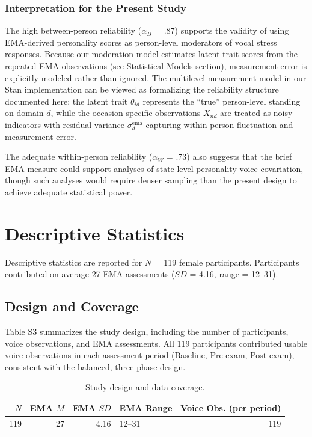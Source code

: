 \documentclass[
  english,
  man,floatsintext]{apa6}
\begin{document}
\subsubsection{Interpretation for the Present Study}\label{interpretation-for-the-present-study}

The high between-person reliability (\(\alpha_B\) = .87) supports the validity of using EMA-derived personality scores as person-level moderators of vocal stress responses. Because our moderation model estimates latent trait scores from the repeated EMA observations (see Statistical Models section), measurement error is explicitly modeled rather than ignored. The multilevel measurement model in our Stan implementation can be viewed as formalizing the reliability structure documented here: the latent trait \(\theta_{id}\) represents the ``true'' person-level standing on domain \(d\), while the occasion-specific observations \(X_{nd}\) are treated as noisy indicators with residual variance \(\sigma_d^{\text{ema}}\) capturing within-person fluctuation and measurement error.

The adequate within-person reliability (\(\alpha_W\) = .73) also suggests that the brief EMA measure could support analyses of state-level personality-voice covariation, though such analyses would require denser sampling than the present design to achieve adequate statistical power.

\newpage

\section{Descriptive Statistics}\label{descriptive-statistics}

Descriptive statistics are reported for \(N\) = 119 female participants. Participants contributed on average 27 EMA assessments (\(SD\) = 4.16, range = 12--31).

\subsection{Design and Coverage}\label{design-and-coverage}

Table S3 summarizes the study design, including the number of participants, voice observations, and EMA assessments. All 119 participants contributed usable voice observations in each assessment period (Baseline, Pre-exam, Post-exam), consistent with the balanced, three-phase design.

\begin{table}

\caption{\label{tab:table-s3-design}Study design and data coverage.}
\centering
\begin{tabular}[t]{rrrlr}
\toprule
$N$ & EMA $M$ & EMA $SD$ & EMA Range & Voice Obs. (per period)\\
\midrule
119 & 27 & 4.16 & 12--31 & 119\\
\bottomrule
\end{tabular}
\end{table}
\end{document}
